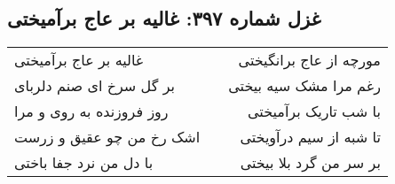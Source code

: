 \begin{center}
\section*{غزل شماره ۳۹۷: غالیه بر عاج برآمیختی}
\label{sec:397}
\begin{longtable}{l p{0.5cm} r}
غالیه بر عاج برآمیختی
&&
مورچه از عاج برانگیختی
\\
بر گل سرخ ای صنم دلربای
&&
رغم مرا مشک سیه بیختی
\\
روز فروزنده به روی و مرا
&&
با شب تاریک برآمیختی
\\
اشک رخ من چو عقیق و زرست
&&
تا شبه از سیم درآویختی
\\
با دل من نرد جفا باختی
&&
بر سر من گرد بلا بیختی
\\
\end{longtable}
\end{center}
